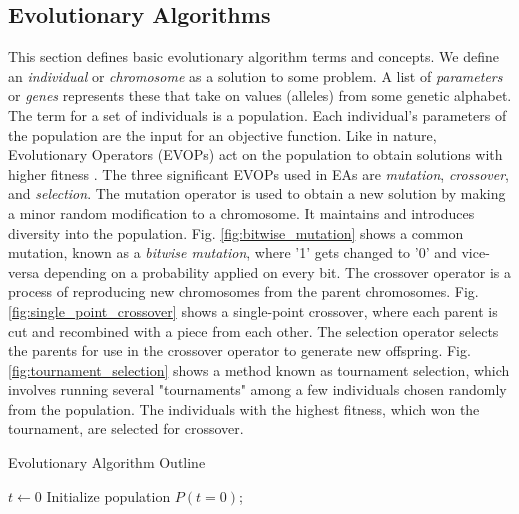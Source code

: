 \documentclass[mscthesis, 11pt]{usiinfthesis}
\theoremstyle{newdefinition}
\begin{document}
\subsection{Evolutionary Algorithms}
This section defines basic evolutionary algorithm terms and concepts. We define an \textit{individual} or \textit{chromosome} as a solution to some problem. A list of \textit{parameters} or \textit{genes} represents these that take on values (alleles) from some genetic alphabet. The term for a set of individuals is a population. Each individual's parameters of the population are the input for an objective function. Like in nature, Evolutionary Operators (EVOPs) act on the population to obtain solutions with higher fitness \cite[~pp.~24--25]{coello_coello_basic_2007}. The three significant EVOPs used in EAs are \textit{mutation}, \textit{crossover}, and \textit{selection}. The mutation operator is used to obtain a new solution by making a minor random modification to a chromosome. It maintains and introduces diversity into the population. Fig. \ref{fig:bitwise_mutation} shows a common mutation, known as a \textit{bitwise mutation}, where '1' gets changed to '0' and vice-versa depending on a probability applied on every bit. The crossover operator is a process of reproducing new chromosomes from the parent chromosomes. Fig. \ref{fig:single_point_crossover} shows a single-point crossover, where each parent is cut and recombined with a piece from each other. The selection operator selects the parents for use in the crossover operator to generate new offspring. Fig. \ref{fig:tournament_selection} shows a method known as tournament selection, which involves running several "tournaments" among a few individuals chosen randomly from the population. The individuals with the highest fitness, which won the tournament, are selected for crossover.
\begin{algorithm}
\caption{Evolutionary Algorithm Outline}\label{alg:ea}
$t \gets 0$\;
Initialize population $P(t = 0)$;\\
\end{algorithm}
\end{document}
